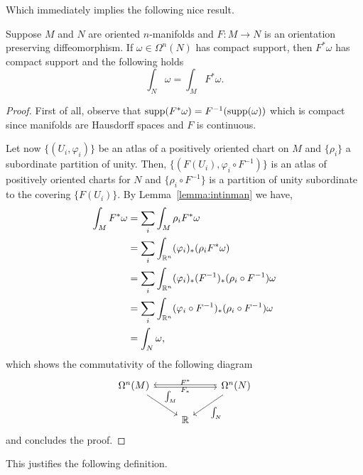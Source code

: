 Which immediately implies the following nice result.
\begin{theorem}\label{thm:gcv}
  Suppose $M$ and $N$ are oriented $n$-manifolds and $F:M\to N$ is an orientation preserving diffeomorphism.
  If $\omega\in\Omega^n(N)$ has compact support, then $F^*\omega$ has compact support and the following holds
  \begin{equation}
    \int_N \omega = \int_M F^* \omega.
  \end{equation}
\end{theorem}
\begin{proof}
  First of all, observe that $\operatorname{supp}(F^*\omega) = F^{-1}(\operatorname{supp}(\omega))$ which is compact since manifolds are Hausdorff spaces and $F$ is continuous.

  Let now $\{(U_i,\varphi_i)\}$ be an atlas of a positively oriented chart on $M$ and $\{\rho_i\}$ a subordinate partition of unity.
  Then, $\{(F(U_i),\varphi_i\circ F^{-1})\}$ is an atlas of positively oriented charts for $N$ and $\{\rho_i \circ F^{-1}\}$ is a partition of unity subordinate to the covering $\{F(U_i)\}$.
  By Lemma~\ref{lemma:intinman} we have,
  \begin{align}
    \int_M F^*\omega &= \sum_i \int_M \rho_i F^*\omega \\
    &= \sum_i \int_{\mathbb{R}^n}(\varphi_i)_*(\rho_i F^*\omega)\\
    &= \sum_i \int_{\mathbb{R}^n}(\varphi_i)_*(F^{-1})_*(\rho_i \circ F^{-1}) \omega \\
    &= \sum_i \int_{\mathbb{R}^n}(\varphi_i \circ F^{-1})_*(\rho_i \circ F^{-1}) \omega \\
    &= \int_N\omega,
  \end{align}
  which shows the commutativity of the following diagram
  \begin{equation}
    \begin{tikzcd}
      \Omega^n(M)
        \arrow[rr, "F^*", above, shift right = 0.5]
        \arrow[dr, "\int_M", below left]
        & & \Omega^n(N)
          \arrow[ll, "F_*", below, shift right = 0.5]
          \arrow[dl, "\int_N"] \\
      & \R &
    \end{tikzcd}
  \end{equation}
  and concludes the proof.
\end{proof}

This justifies the following definition.


